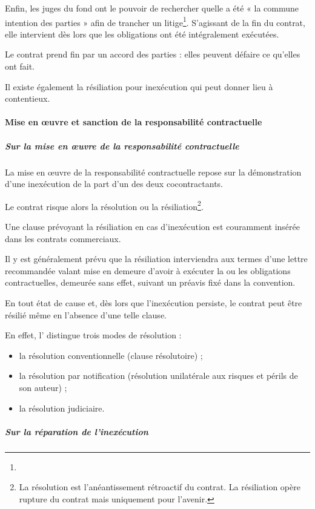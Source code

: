   Enfin, les juges du fond ont le pouvoir de rechercher quelle a été « la commune intention des parties » afin de trancher un litige\footnote{}. S'agissant de la fin du contrat, elle intervient dès lors que les obligations ont été intégralement exécutées.

  Le contrat prend fin par un accord des parties : elles peuvent défaire ce qu'elles ont fait.

  Il existe également la résiliation pour inexécution qui peut donner lieu à contentieux.

  \paragraph{Mise en œuvre et sanction de la responsabilité contractuelle}

  \subparagraph{Sur la mise en œuvre de la responsabilité contractuelle}

  La mise en œuvre de la responsabilité contractuelle repose sur la démonstration d'une inexécution de la part d'un des deux cocontractants.

  Le contrat risque alors la résolution ou la résiliation\footnote{La résolution est l'anéantissement rétroactif du contrat. La résiliation opère rupture du contrat mais uniquement pour l'avenir.}.

  Une clause prévoyant la résiliation en cas d'inexécution est couramment insérée dans les contrats commerciaux.

  Il y est généralement prévu que la résiliation interviendra aux termes d'une lettre recommandée valant mise en demeure d'avoir à exécuter la ou les obligations contractuelles, demeurée sans effet, suivant un préavis fixé dans la convention.

  En tout état de cause et, dès lors que l'inexécution persiste, le contrat peut être résilié même en l'absence d'une telle clause.

  En effet, l' distingue trois modes de résolution :
  \begin{itemize}
    \item la résolution conventionnelle (clause résolutoire) ;
    \item la résolution par notification (résolution unilatérale aux risques et périls de son auteur) ;
    \item la résolution judiciaire.
  \end{itemize}


  \subparagraph{Sur la réparation de l'inexécution}

